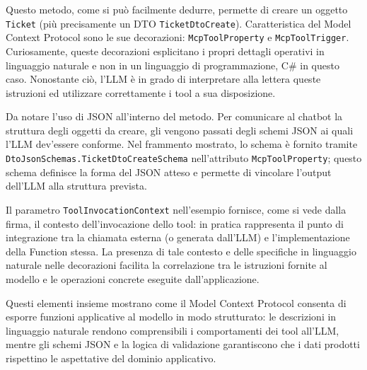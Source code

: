 Questo metodo, come si può facilmente dedurre, permette di creare un oggetto \texttt{Ticket} (più precisamente un DTO \texttt{TicketDtoCreate}).
Caratteristica del Model Context Protocol sono le sue decorazioni: \texttt{McpToolProperty} e \texttt{McpToolTrigger}. Curiosamente, queste
decorazioni esplicitano i propri dettagli operativi in linguaggio naturale e non in un linguaggio di programmazione, C\# in questo caso.
Nonostante ciò, l'LLM è in grado di interpretare alla lettera queste istruzioni ed utilizzare correttamente i tool a sua disposizione.

Da notare l'uso di JSON all'interno del metodo. Per comunicare al chatbot la struttura degli oggetti da creare, gli vengono passati
degli schemi JSON ai quali l'LLM dev'essere conforme. Nel frammento mostrato, lo schema è fornito tramite \texttt{DtoJsonSchemas.TicketDtoCreateSchema}
nell'attributo \texttt{McpToolProperty}; questo schema definisce la forma del JSON atteso e permette di vincolare l'output dell'LLM alla struttura prevista.

Il parametro \texttt{ToolInvocationContext} nell'esempio fornisce, come si vede dalla firma, il contesto dell'invocazione dello tool:
in pratica rappresenta il punto di integrazione tra la chiamata esterna (o generata dall'LLM) e l'implementazione della Function stessa.
La presenza di tale contesto e delle specifiche in linguaggio naturale nelle decorazioni facilita la correlazione tra le istruzioni fornite al modello
e le operazioni concrete eseguite dall'applicazione.

Questi elementi insieme mostrano come il Model Context Protocol consenta di esporre funzioni applicative al modello in modo strutturato:
le descrizioni in linguaggio naturale rendono comprensibili i comportamenti dei tool all'LLM, mentre gli schemi JSON e la logica di validazione
garantiscono che i dati prodotti rispettino le aspettative del dominio applicativo.

